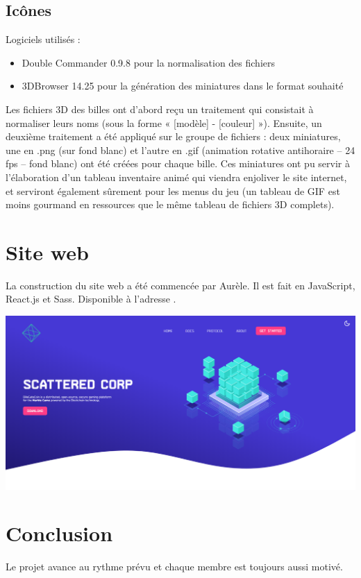 \documentclass{article}
\begin{document}
\subsection{Icônes}
Logiciels utilisés :
\begin{itemize}
    \item Double Commander 0.9.8 pour la normalisation des fichiers
    \item 3DBrowser 14.25 pour la génération des miniatures dans le format souhaité\\
\end{itemize}

Les fichiers 3D des billes ont d’abord reçu un traitement qui consistait à normaliser leurs noms (sous la forme « [modèle] - [couleur] »).
Ensuite, un deuxième traitement a été appliqué sur le groupe de fichiers : deux miniatures, une en .png (sur fond blanc) et l’autre en .gif (animation rotative antihoraire – 24 fps – fond blanc) ont été créées pour chaque bille.
Ces miniatures ont pu servir à l’élaboration d’un tableau inventaire animé qui viendra enjoliver le site internet, et serviront également sûrement pour les menus du jeu (un tableau de GIF est moins gourmand en ressources que le même tableau de fichiers 3D complets).


\section{Site web}
La construction du site web a été commencée par Aurèle. Il est fait en JavaScript, React.js et Sass.
Disponible à l'adresse .\\[1ex]
\begin{center}
\includegraphics[width=0.8\linewidth]{report/website.png}\\
\end{center}

\section{Conclusion}
Le projet avance au rythme prévu et chaque membre est toujours aussi motivé.
\end{document}
